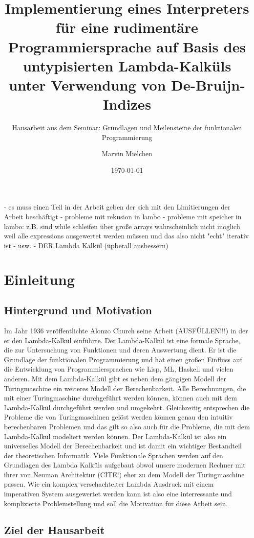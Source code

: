 \documentclass[ngerman]{article}
\title{Implementierung eines Interpreters für eine rudimentäre Programmiersprache auf Basis des untypisierten Lambda-Kalküls unter Verwendung von De-Bruijn-Indizes}
\author{Marvin Mielchen}
\subtitle{Hausarbeit aus dem Seminar: Grundlagen und Meilensteine der funktionalen Programmierung}
\date{\today}
\begin{document}
\maketitle

- es muss einen Teil in der Arbeit geben der sich mit den Limitierungen der Arbeit beschäftigt
    - probleme mit rekusion in lambo
    - probleme mit speicher in lambo: z.B. sind while schleifen über große arrays wahrscheinlich nicht möglich weil alle expressions ausgewertet werden müssen und
    das also nicht "echt" iterativ ist
    - usw.
- DER Lambda Kalkül (üpberall ausbessern)

\section{Einleitung}

\subsection{Hintergrund und Motivation}

Im Jahr 1936 veröffentlichte Alonzo Church seine Arbeit (AUSFÜLLEN!!!) in der er den Lambda-Kalkül einführte. 
Der Lambda-Kalkül ist eine formale Sprache, die zur Untersuchung von Funktionen und deren Auswertung dient. Er ist die Grundlage der funktionalen Programmierung und hat einen großen Einfluss auf die Entwicklung von Programmiersprachen wie Lisp, ML, Haskell und vielen anderen.
Mit dem Lambda-Kalkül gibt es neben dem gängigen Modell der Turingmaschine ein weiteres Modell der Berechenbarkeit. Alle Berechnungen, die mit einer Turingmaschine durchgeführt werden können, können auch mit dem Lambda-Kalkül durchgeführt werden und umgekehrt.
Gleichzeitig entsprechen die Probleme die von Turingmaschinen gelöst werden können genau den intuitiv berechenbaren Problemen und das gilt so also auch für die Probleme, die mit dem Lambda-Kalkül modeliert werden können.
Der Lambda-Kalkül ist also ein universelles Modell der Berechenbarkeit und ist damit ein wichtiger Bestandteil der theoretischen Informatik. Viele Funktionale Sprachen werden auf den Grundlagen des Lambda Kalküls aufgebaut obwol unsere modernen Rechner mit ihrer von Neuman Architektur (CITE!) eher zu dem Modell der Turingmaschine passen.
Wie ein komplex verschachtelter Lambda Ausdruck mit einem imperativen System ausgewertet werden kann ist also eine interressante und komplizierte Problemstellung und soll die Motivation für diese Arbeit sein.

\subsection{Ziel der Hausarbeit}
\end{document}
